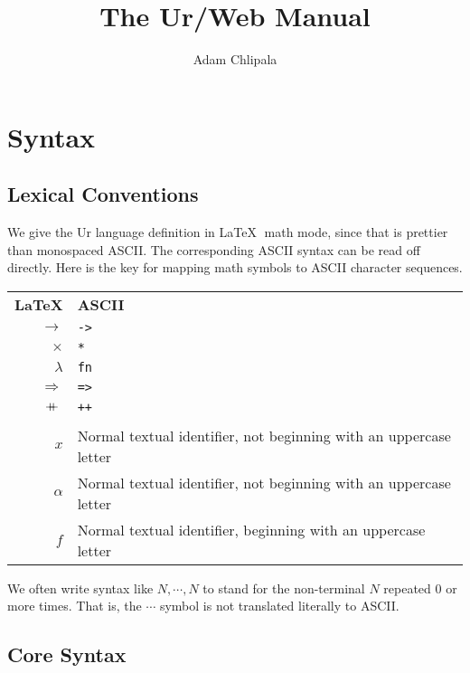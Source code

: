 \documentclass{article}
\newcommand{\cd}[1]{\texttt{#1}}
\newcommand{\rc}{+ \hspace{-.075in} + \;}
\begin{document}
\title{The Ur/Web Manual}
\author{Adam Chlipala}

\maketitle

\section{Syntax}

\subsection{Lexical Conventions}

We give the Ur language definition in \LaTeX $\;$ math mode, since that is prettier than monospaced ASCII.  The corresponding ASCII syntax can be read off directly.  Here is the key for mapping math symbols to ASCII character sequences.

\begin{center}
  \begin{tabular}{rl}
    \textbf{\LaTeX} & \textbf{ASCII} \\
    $\to$ & \cd{->} \\
    $\times$ & \cd{*} \\
    $\lambda$ & \cd{fn} \\
    $\Rightarrow$ & \cd{=>} \\
    $\rc$ & \cd{++} \\
    \\
    $x$ & Normal textual identifier, not beginning with an uppercase letter \\
    $\alpha$ & Normal textual identifier, not beginning with an uppercase letter \\
    $f$ & Normal textual identifier, beginning with an uppercase letter \\
  \end{tabular}
\end{center}

We often write syntax like $N, \cdots, N$ to stand for the non-terminal $N$ repeated 0 or more times.  That is, the $\cdots$ symbol is not translated literally to ASCII.

\subsection{Core Syntax}
\end{document}
